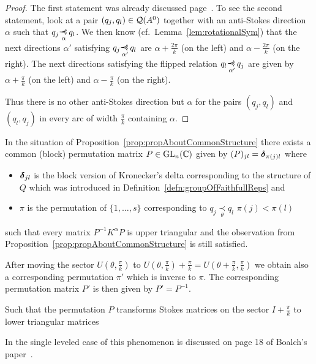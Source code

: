 \begin{proof}
  The first statement was already discussed
  page~\pageref{page:firstStatementOnTheStructure}.
  To see the second statement, look at a pair $(q_j,q_l)\in\mathcal{Q}(A^0)$ together
  with an anti-Stokes direction $\alpha$ such that $q_j\myrel{\alpha}q_l$. We
  then know (cf.\ Lemma~\ref{lem:rotationalSym}) that the next directions
  $\alpha'$ satisfying $q_j\myrel{\alpha'}q_l$ are $\alpha+\frac{2\pi}{k}$ (on
  the left) and $\alpha-\frac{2\pi}{k}$ (on the right).
  The next directions satisfying the flipped relation $q_l\myrel{\alpha'}q_j$
  are given by $\alpha+\frac{\pi}{k}$ (on the left) and
  $\alpha-\frac{\pi}{k}$ (on the right).

  Thus there is no other anti-Stokes direction but $\alpha$ for the pairs
  $(q_j,q_l)$ and $(q_l,q_j)$ in every arc of width $\frac{\pi}{k}$ containing
  $\alpha$.
\end{proof}
\begin{cor}\label{cor:someCorolaryToLabel}
  In the situation of Proposition~\ref{prop:propAboutCommonStructure}
  there exists a common (block) permutation matrix $P\in\operatorname{GL}_n(\mathbb{C})$ given by
  $(P)_{jl}=\boldsymbol{\delta}_{\pi(j)l}$ where
  \begin{itemize}
  \item $\boldsymbol{\delta}_{jl}$ is the block version of Kronecker's delta corresponding
    to the structure of $Q$ which was introduced in
    Definition~\ref{defn:groupOfFaithfullReps} and
  \item $\pi$ is the permutation of $\{1,\dots,s\}$ corresponding to
    $q_j\underset{\theta}{\prec}q_l$ \Rightarrow{} $\pi(j)<\pi(l)$
  \end{itemize}
  such that every matrix $P^{-1}K^{\alpha}P$ is upper triangular and the
  observation from Proposition~\ref{prop:propAboutCommonStructure} is still
  satisfied.
  \begin{s-rem}
    After moving the sector $U(\theta,\frac{\pi}{k})$ to
    $U(\theta,\frac{\pi}{k})+\frac{\pi}{k}
    =U(\theta+\frac{\pi}{k},\frac{\pi}{k})$ we obtain also a corresponding
    permutation $\pi'$ which is inverse to $\pi$.
    The corresponding permutation matrix $P'$ is then given by $P'=P^{-1}$.

    Such that the permutation $P$ transforms Stokes matrices on the sector
    $I+\frac{\pi}{k}$ to lower triangular matrices
  \end{s-rem}
  In the single leveled case of this phenomenon is discussed on page 18 of
  Boalch's paper~\cite{boalch}.
\end{cor}

